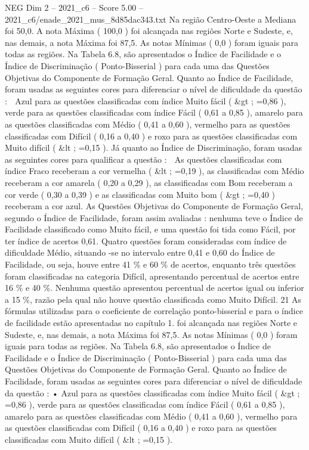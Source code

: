 \begin{textsample}{NEG Dim 2 – 2021\_c6 – Score 5.00 – 2021\_c6/enade\_2021\_mus\_8d85dac343.txt}
Na região Centro-Oeste a Mediana foi 50,0.
A nota Máxima ( 100,0 ) foi alcançada nas regiões Norte e Sudeste, e, nas demais, a nota Máxima foi 87,5.
As notas Mínimas ( 0,0 ) foram iguais para todas as regiões.
Na Tabela 6.8, são apresentados o Índice de Facilidade e o Índice de Discriminação ( Ponto-Bisserial ) para cada uma das Questões Objetivas do Componente de Formação Geral.
Quanto ao Índice de Facilidade, foram usadas as seguintes cores para diferenciar o nível de dificuldade da questão :  Azul para as questões classificadas com índice Muito fácil ( \&gt ; =0,86 ), verde para as questões classificadas com índice Fácil ( 0,61 a 0,85 ), amarelo para as questões classificadas com Médio ( 0,41 a 0,60 ), vermelho para as questões classificadas com Difícil ( 0,16 a 0,40 ) e roxo para as questões classificadas com Muito difícil ( \&lt ; =0,15 ).
Já quanto ao Índice de Discriminação, foram usadas as seguintes cores para qualificar a questão :  As questões classificadas com índice Fraco receberam a cor vermelha ( \&lt ; =0,19 ), as classificadas com Médio receberam a cor amarela ( 0,20 a 0,29 ), as classificadas com Bom receberam a cor verde ( 0,30 a 0,39 ) e as classificadas com Muito bom ( \&gt ; =0,40 ) receberam a cor azul.
As Questões Objetivas do Componente de Formação Geral, segundo o Índice de Facilidade, foram assim avaliadas : nenhuma teve o Índice de Facilidade classificado como Muito fácil, e uma questão foi tida como Fácil, por ter índice de acertos 0,61.
Quatro questões foram consideradas com índice de dificuldade Médio, situando -se no intervalo entre 0,41 e 0,60 do Índice de Facilidade, ou seja, houve entre 41 \% e 60 \% de acertos, enquanto três questões foram classificadas na categoria Difícil, apresentando percentual de acertos entre 16 \% e 40 \%.
Nenhuma questão apresentou percentual de acertos igual ou inferior a 15 \%, razão pela qual não houve questão classificada como Muito Difícil. 21 As fórmulas utilizadas para o coeficiente de correlação ponto-bisserial e para o índice de facilidade estão apresentadas no capítulo 1. foi alcançada nas regiões Norte e Sudeste, e, nas demais, a nota Máxima foi 87,5.
As notas Mínimas ( 0,0 ) foram iguais para todas as regiões.
Na Tabela 6.8, são apresentados o Índice de Facilidade e o Índice de Discriminação ( Ponto-Bisserial ) para cada uma das Questões Objetivas do Componente de Formação Geral.
Quanto ao Índice de Facilidade, foram usadas as seguintes cores para diferenciar o nível de dificuldade da questão : • Azul para as questões classificadas com índice Muito fácil ( \&gt ; =0,86 ), verde para as questões classificadas com índice Fácil ( 0,61 a 0,85 ), amarelo para as questões classificadas com Médio ( 0,41 a 0,60 ), vermelho para as questões classificadas com Difícil ( 0,16 a 0,40 ) e roxo para as questões classificadas com Muito difícil ( \&lt ; =0,15 ).

\end{textsample}

